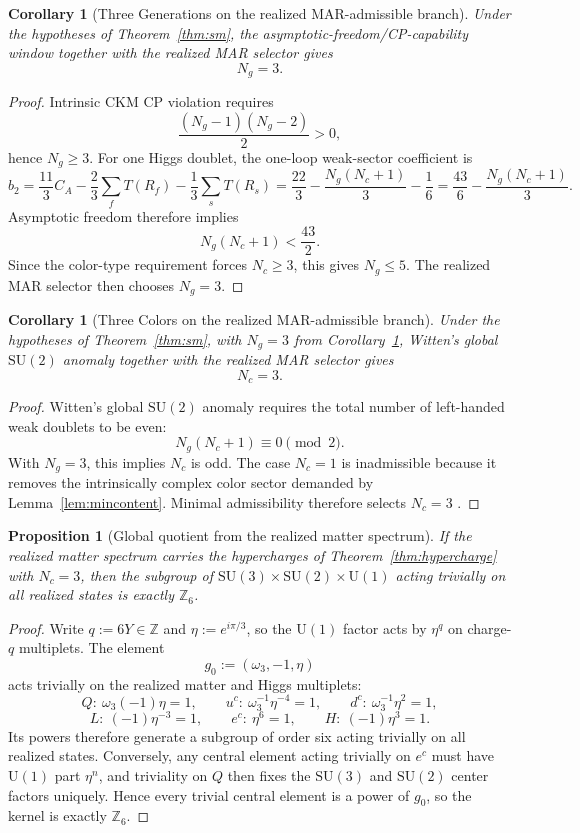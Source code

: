 \documentclass[11pt]{article}
\newtheorem{corollary}[theorem]{Corollary}
\newtheorem{proposition}[theorem]{Proposition}
\newcommand{\SU}{\mathrm{SU}}
\newcommand{\U}{\mathrm{U}}
\begin{document}
\begin{corollary}[Three Generations on the realized MAR-admissible branch]\label{cor:ng}
Under the hypotheses of Theorem~\ref{thm:sm}, the asymptotic-freedom/CP-capability window together with the realized MAR selector gives
\[
N_g=3.
\]
\end{corollary}

\begin{proof}
Intrinsic CKM CP violation requires
\[
\frac{(N_g-1)(N_g-2)}{2}>0,
\]
hence $N_g\ge 3$. For one Higgs doublet, the one-loop weak-sector coefficient is
\[
b_2=\frac{11}{3}C_A-\frac{2}{3}\sum_f T(R_f)-\frac{1}{3}\sum_s T(R_s)
=
\frac{22}{3}-\frac{N_g(N_c+1)}{3}-\frac16
=
\frac{43}{6}-\frac{N_g(N_c+1)}{3}.
\]
Asymptotic freedom therefore implies
\[
N_g(N_c+1)<\frac{43}{2}.
\]
Since the color-type requirement forces $N_c\ge 3$, this gives $N_g\le 5$. The realized MAR selector then chooses $N_g=3$.
\end{proof}

\begin{corollary}[Three Colors on the realized MAR-admissible branch]\label{cor:nc}
Under the hypotheses of Theorem~\ref{thm:sm}, with \(N_g=3\) from Corollary~\ref{cor:ng}, Witten's global \(\SU(2)\) anomaly together with the realized MAR selector gives
\[
N_c=3.
\]
\end{corollary}

\begin{proof}
Witten's global $\SU(2)$ anomaly requires the total number of left-handed weak doublets to be even:
\[
N_g(N_c+1)\equiv 0 \pmod 2.
\]
With $N_g=3$, this implies $N_c$ is odd. The case $N_c=1$ is inadmissible because it removes the intrinsically complex color sector demanded by Lemma~\ref{lem:mincontent}. Minimal admissibility therefore selects $N_c=3$ \cite{witten82}.
\end{proof}

\begin{proposition}[Global quotient from the realized matter spectrum]\label{prop:z6}
If the realized matter spectrum carries the hypercharges of Theorem~\ref{thm:hypercharge} with $N_c=3$, then the subgroup of $\SU(3)\times\SU(2)\times\U(1)$ acting trivially on all realized states is exactly $\mathbb Z_6$.
\end{proposition}

\begin{proof}
Write $q:=6Y\in\mathbb Z$ and $\eta:=e^{i\pi/3}$, so the $\U(1)$ factor acts by $\eta^q$ on charge-$q$ multiplets. The element
\[
g_0:=(\omega_3,-1,\eta)
\]
acts trivially on the realized matter and Higgs multiplets:
\[
Q:\ \omega_3(-1)\eta=1,\qquad
u^c:\ \omega_3^{-1}\eta^{-4}=1,\qquad
d^c:\ \omega_3^{-1}\eta^2=1,
\]
\[
L:\ (-1)\eta^{-3}=1,\qquad
e^c:\ \eta^6=1,\qquad
H:\ (-1)\eta^3=1.
\]
Its powers therefore generate a subgroup of order six acting trivially on all realized states. Conversely, any central element acting trivially on $e^c$ must have $\U(1)$ part $\eta^n$, and triviality on $Q$ then fixes the $\SU(3)$ and $\SU(2)$ center factors uniquely. Hence every trivial central element is a power of $g_0$, so the kernel is exactly $\mathbb Z_6$.
\end{proof}
\end{document}
